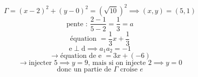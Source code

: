 \documentclass{article}
\begin{document}
\[ \Gamma = (x-2)^2 + (y-0)^2 = (\sqrt{10})^2 \implies (x,y) = (5,1) \]
\[ \text{pente : } \frac{2-1}{5-2} = \frac{1}{3} = a \]
\[ \text{équation } = \frac{1}{3}x + \frac{1}{3} \]
\[ \text{e} \perp \text{d} \implies a_1 a_2 = -1 \]
\[ \to \text{équation de e } = 3x + (-6) \]
\[ \to \text{injecter } 5 \implies y = 9 \text{, mais si on injecte } 2 \implies y = 0 \]
\[ \text{donc un partie de } \Gamma \text{ croise } e \]
\end{document}
